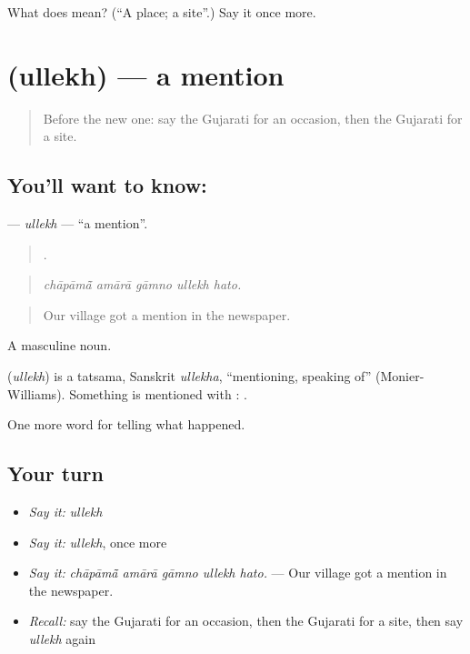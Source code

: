 \begin{tcolorbox}[breakable,colback=teal!4,colframe=teal!35!black,title={Before you move on}]
What does  mean? (\textquotedblleft{}A place; a site\textquotedblright{}.) Say it once more.
\end{tcolorbox}
\section[\texorpdfstring{\gu{ઉલ્લેખ} (ullekh)}{ઉલ્લેખ (ullekh)}]{ (ullekh) — a mention}

\label{lesson:GU-C315-ullekh}



\begin{quote}
Before the new one: say the Gujarati for an occasion, then the Gujarati for a site.
\end{quote}

\subsection*{You'll want to know: }
\textbf{} — \emph{ullekh} — \textquotedblleft{}a mention\textquotedblright{}.

\begin{quote}
    .
\end{quote}

\begin{quote}
\emph{chāpāmā̃ amārā gāmno ullekh hato.}
\end{quote}

\begin{quote}
Our village got a mention in the newspaper.
\end{quote}

A masculine noun.

\begin{cousinweb}
\textbf{} (\emph{ullekh}) is a tatsama, Sanskrit \emph{ullekha}, \textquotedblleft{}mentioning, speaking of\textquotedblright{} (Monier-Williams). Something is mentioned with \textbf{}: \textbf{ }.
\end{cousinweb}

\begin{grammarlens}[title={What you've built}]
One more word for telling what happened.
\end{grammarlens}

\subsection*{Your turn}
\begin{itemize}
\raggedright
  \item \emph{Say it:} \emph{ullekh}
  \item \emph{Say it:} \emph{ullekh}, once more
  \item \emph{Say it:} \emph{chāpāmā̃ amārā gāmno ullekh hato.} — Our village got a mention in the newspaper.
  \item \emph{Recall:} say the Gujarati for an occasion, then the Gujarati for a site, then say \emph{ullekh} again
\end{itemize}

